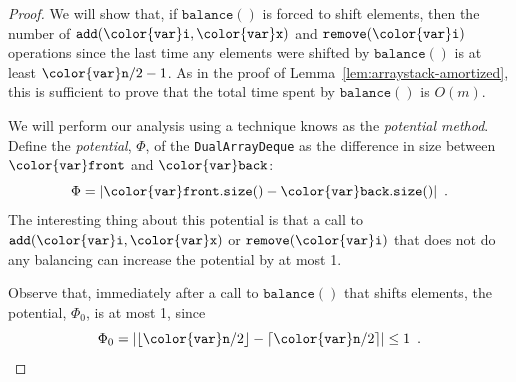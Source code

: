 \documentclass[10pt]{book}
\theoremstyle{plain}
\newcommand{\lemref}[1]{Lemma~\ref{lem:#1}}
\theoremstyle{definition}
\begin{document}
\begin{proof}
  We will show that, if \ensuremath{\mathtt{balance()}} is forced to shift elements, then
  the number of \ensuremath{\mathtt{add({\color{var}i},{\color{var}x})}} and \ensuremath{\mathtt{remove({\color{var}i})}} operations since the last
  time any elements were shifted by \ensuremath{\mathtt{balance()}} is at least $\ensuremath{\mathtt{{\color{var}n}}}/2-1$.
  As in the proof of \lemref{arraystack-amortized}, this is sufficient
  to prove that the total time spent by \ensuremath{\mathtt{balance()}} is $O(m)$.

  We will perform our analysis using a technique knows as the
  \emph{potential method}.
  Define the \emph{potential}, $\Phi$, of the
  \texttt{DualArrayDeque} as the difference in size between \ensuremath{\mathtt{{\color{var}front}}} and \ensuremath{\mathtt{{\color{var}back}}}:
  \[  \Phi = |\ensuremath{\mathtt{{\color{var}front}.size()}} - \ensuremath{\mathtt{{\color{var}back}.size()}}| \enspace . \]
  The interesting thing about this potential is that a call to \ensuremath{\mathtt{add({\color{var}i},{\color{var}x})}}
  or \ensuremath{\mathtt{remove({\color{var}i})}} that does not do any balancing can increase the potential
  by at most 1.

  Observe that, immediately after a call to \ensuremath{\mathtt{balance()}} that shifts
  elements, the potential, $\Phi_0$, is at most 1, since
  \[ \Phi_0 = \left|\lfloor\ensuremath{\mathtt{{\color{var}n}}}/2\rfloor-\lceil\ensuremath{\mathtt{{\color{var}n}}}/2\rceil\right|\le 1  \enspace .\]


\end{proof}
\end{document}
